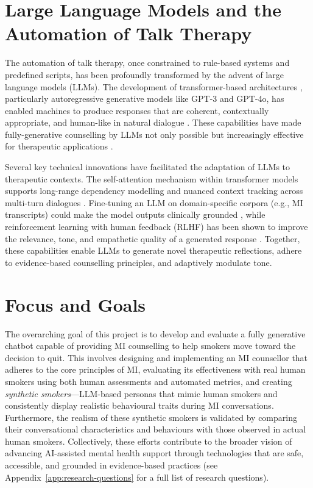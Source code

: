 \section{Large Language Models and the Automation of Talk Therapy}
The automation of talk therapy, once constrained to rule-based systems and predefined scripts, has been profoundly transformed by the advent of large language models (LLMs). The development of transformer-based architectures \cite{vaswani2017attention}, particularly autoregressive generative models like GPT-3 and GPT-4o, has enabled machines to produce responses that are coherent, contextually appropriate, and human-like in natural dialogue \cite{openai2023gpt4}. These capabilities have made fully-generative counselling by LLMs not only possible but increasingly effective for therapeutic applications \cite{miner2020artificial, LEE2021856}.

Several key technical innovations have facilitated the adaptation of LLMs to therapeutic contexts. The self-attention mechanism within transformer models supports long-range dependency modelling and nuanced context tracking across multi-turn dialogues \cite{vaswani2017attention}. Fine-tuning an LLM on domain-specific corpora (e.g., MI transcripts) could make the model outputs clinically grounded \cite{kong2025llmtherapistssalespeopleevaluating}, while reinforcement learning with human feedback (RLHF) has been shown to improve the relevance, tone, and empathetic quality of a generated response \cite{10.5555/3600270.3602281}. Together, these capabilities enable LLMs to generate novel therapeutic reflections, adhere to evidence-based counselling principles, and adaptively modulate tone.



\section{Focus and Goals}
The overarching goal of this project is to develop and evaluate a fully generative chatbot capable of providing MI counselling to help smokers move toward the decision to quit. This involves designing and implementing an MI counsellor that adheres to the core principles of MI, evaluating its effectiveness with real human smokers using both human assessments and automated metrics, and creating \emph{synthetic smokers}---LLM-based personas that mimic human smokers and consistently display realistic behavioural traits during MI conversations. Furthermore, the realism of these synthetic smokers is validated by comparing their conversational characteristics and behaviours with those observed in actual human smokers. Collectively, these efforts contribute to the broader vision of advancing AI-assisted mental health support through technologies that are safe, accessible, and grounded in evidence-based practices (see Appendix~\ref{app:research-questions} for a full list of research questions).


